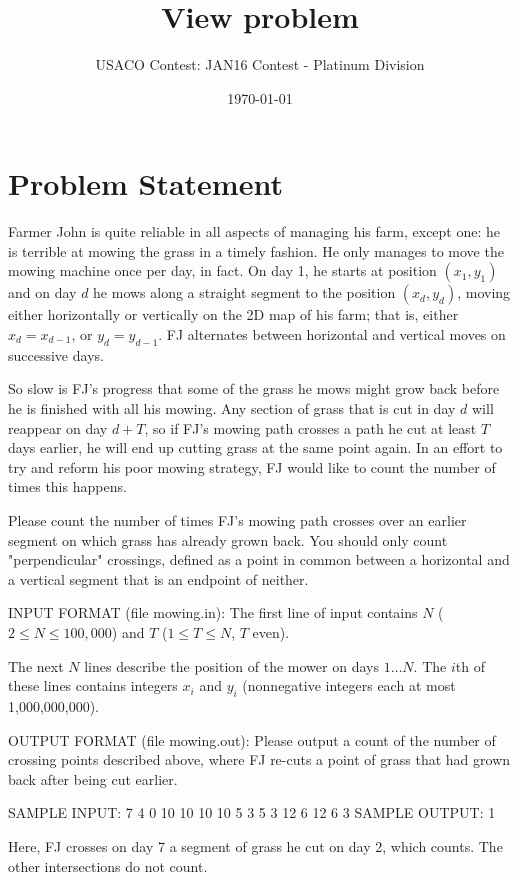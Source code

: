 \documentclass[12pt]{article}
\title{View problem}
\author{USACO Contest: JAN16 Contest - Platinum Division}
\date{\today}
\begin{document}
\maketitle

\section*{Problem Statement}

Farmer John is quite reliable in all aspects of managing his farm, except one:
he is terrible at mowing the grass in a timely fashion.   He only manages to
move the mowing machine once per day, in fact. On day 1, he starts at position
$(x_1, y_1)$ and on day $d$ he mows along a straight segment to the position
$(x_d, y_d)$, moving either horizontally or vertically on the 2D map of his
farm; that is, either  $x_d = x_{d-1}$, or $y_d = y_{d-1}$.  FJ alternates
between horizontal and vertical moves on successive days.

So slow is FJ's progress that some of the grass he mows might grow back before
he is finished with all his mowing. Any section of grass that is cut in day $d$
will reappear on day $d + T$, so if FJ's mowing path crosses a path he cut at
least $T$ days earlier, he will end up cutting grass at the same point again. 
In an effort to try and reform his poor mowing strategy, FJ would like to count
the number of times this happens.  

Please count the number of times FJ's mowing path crosses over an earlier
segment on which grass has already grown back.  You should only count
"perpendicular" crossings, defined as a point in common between a horizontal and
a vertical segment that is an endpoint of neither.

INPUT FORMAT (file mowing.in):
The first line of input contains $N$ ($2 \leq N \leq 100,000$) and $T$
($1 \leq T \leq N$, $T$ even).  

The next $N$ lines describe the position of the mower on days $1 \ldots N$.  The
$i$th of these lines contains integers $x_i$ and $y_i$ (nonnegative integers
each at most 1,000,000,000).

OUTPUT FORMAT (file mowing.out):
Please output a count of the number of crossing points described above, where FJ
re-cuts a point of grass that had grown back after being cut earlier.

SAMPLE INPUT:
7 4
0 10
10 10
10 5
3 5
3 12
6 12
6 3
SAMPLE OUTPUT: 
1

Here, FJ crosses on day 7 a segment of grass he cut on day 2, which counts. The
other intersections do not count.
\end{document}
